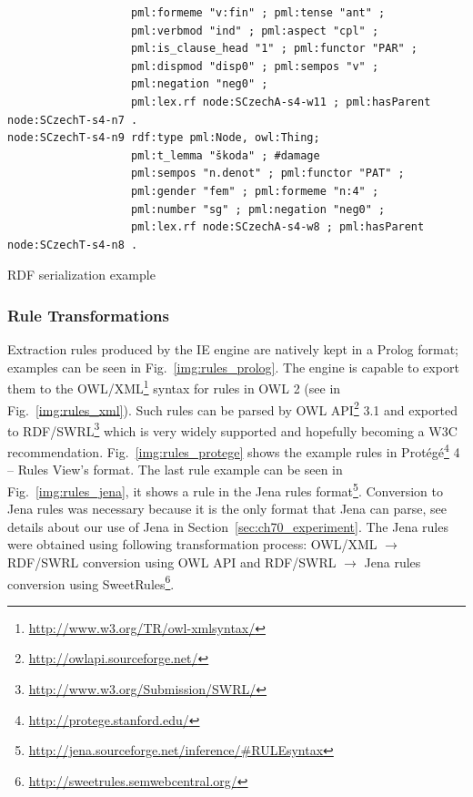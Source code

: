 \begin{listing}[ht]
\begin{verbatim}
                   pml:formeme "v:fin" ; pml:tense "ant" ;
                   pml:verbmod "ind" ; pml:aspect "cpl" ;
                   pml:is_clause_head "1" ; pml:functor "PAR" ;
                   pml:dispmod "disp0" ; pml:sempos "v" ;
                   pml:negation "neg0" ;
                   pml:lex.rf node:SCzechA-s4-w11 ; pml:hasParent node:SCzechT-s4-n7 .
node:SCzechT-s4-n9 rdf:type pml:Node, owl:Thing;
                   pml:t_lemma "škoda" ; #damage
                   pml:sempos "n.denot" ; pml:functor "PAT" ;
                   pml:gender "fem" ; pml:formeme "n:4" ;
                   pml:number "sg" ; pml:negation "neg0" ;
                   pml:lex.rf node:SCzechA-s4-w8 ; pml:hasParent node:SCzechT-s4-n8 .
\end{verbatim}
\caption{RDF serialization example}
\label{lst:rdf_serialization}
\end{listing}






\subsubsection{Rule Transformations}

Extraction rules produced by the IE engine are natively kept in a Prolog format; examples can be seen in Fig.~\ref{img:rules_prolog}. The engine is capable to export them to the OWL/XML\footnote{\url{http://www.w3.org/TR/owl-xmlsyntax/}} syntax for rules in OWL 2 \citep{GHPP09a} (see in Fig.~\ref{img:rules_xml}). Such rules can be parsed by OWL API\footnote{\url{http://owlapi.sourceforge.net/}} 3.1
and exported to RDF/SWRL\footnote{\url{http://www.w3.org/Submission/SWRL/}} which is very widely supported and hopefully becoming a W3C recommendation.
Fig.~\ref{img:rules_protege} shows the example rules in Prot\'{e}g\'{e}\footnote{\url{http://protege.stanford.edu/}} 4 -- Rules View's format. The last rule example can be seen in Fig.~\ref{img:rules_jena}, it shows a rule in the Jena rules format\footnote{\url{http://jena.sourceforge.net/inference/#RULEsyntax}}. Conversion to Jena rules was necessary because it is the only format that Jena can parse, see details about our use of Jena in Section~\ref{sec:ch70_experiment}. The Jena rules were obtained using following transformation process: OWL/XML $\rightarrow$ RDF/SWRL conversion using OWL API and RDF/SWRL $\rightarrow$ Jena rules conversion using SweetRules\footnote{\url{http://sweetrules.semwebcentral.org/}}.

